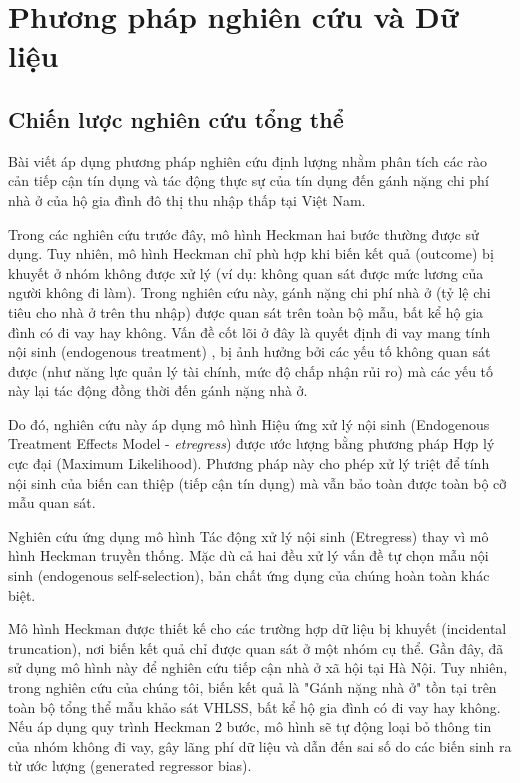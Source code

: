 \documentclass[12pt,a4paper]{report}
\begin{document}
\chapter{Phương pháp nghiên cứu và Dữ liệu}

\section{Chiến lược nghiên cứu tổng thể}

Bài viết áp dụng phương pháp nghiên cứu định lượng nhằm phân tích các rào cản tiếp cận tín dụng và tác động thực sự của tín dụng đến gánh nặng chi phí nhà ở của hộ gia đình đô thị thu nhập thấp tại Việt Nam. 

Trong các nghiên cứu trước đây, mô hình Heckman hai bước thường được sử dụng. Tuy nhiên, mô hình Heckman chỉ phù hợp khi biến kết quả (outcome) bị khuyết ở nhóm không được xử lý (ví dụ: không quan sát được mức lương của người không đi làm). Trong nghiên cứu này, gánh nặng chi phí nhà ở (tỷ lệ chi tiêu cho nhà ở trên thu nhập) được quan sát trên toàn bộ mẫu, bất kể hộ gia đình có đi vay hay không. Vấn đề cốt lõi ở đây là quyết định đi vay mang tính nội sinh (endogenous treatment) , bị ảnh hưởng bởi các yếu tố không quan sát được (như năng lực quản lý tài chính, mức độ chấp nhận rủi ro) mà các yếu tố này lại tác động đồng thời đến gánh nặng nhà ở.

Do đó, nghiên cứu này áp dụng mô hình Hiệu ứng xử lý nội sinh (Endogenous Treatment Effects Model - \textit{etregress}) được ước lượng bằng phương pháp Hợp lý cực đại (Maximum Likelihood). Phương pháp này cho phép xử lý triệt để tính nội sinh của biến can thiệp (tiếp cận tín dụng) mà vẫn bảo toàn được toàn bộ cỡ mẫu quan sát.

Nghiên cứu ứng dụng mô hình Tác động xử lý nội sinh (Etregress) thay vì mô hình Heckman truyền thống. Mặc dù cả hai đều xử lý vấn đề tự chọn mẫu nội sinh (endogenous self-selection), bản chất ứng dụng của chúng hoàn toàn khác biệt.

Mô hình Heckman \parencite{Heckman1979} được thiết kế cho các trường hợp dữ liệu bị khuyết (incidental truncation), nơi biến kết quả chỉ được quan sát ở một nhóm cụ thể. Gần đây, \textcite{UEH2023} đã sử dụng mô hình này để nghiên cứu tiếp cận nhà ở xã hội tại Hà Nội. Tuy nhiên, trong nghiên cứu của chúng tôi, biến kết quả là "Gánh nặng nhà ở" tồn tại trên toàn bộ tổng thể mẫu khảo sát VHLSS, bất kể hộ gia đình có đi vay hay không. Nếu áp dụng quy trình Heckman 2 bước, mô hình sẽ tự động loại bỏ thông tin của nhóm không đi vay, gây lãng phí dữ liệu và dẫn đến sai số do các biến sinh ra từ ước lượng (generated regressor bias). 
\end{document}
